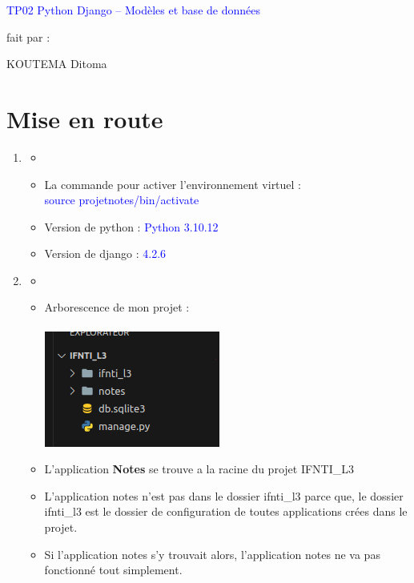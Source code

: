 \documentclass[10pt,a4paper]{article}
\author{KOUTEMA Ditoma}
\begin{document}

\begin{shadedbox}
\begin{center}
\huge \textcolor{blue}{TP02 Python Django – Modèles et base de données}
\end{center}
\end{shadedbox}
\large{\begin{center}
fait par : 
\end{center}}
\begin{center}
\huge{KOUTEMA Ditoma}
\end{center}
\newpage
\tableofcontents
\newpage

\section{Mise en route}
\begin{enumerate}
\item 
\begin{itemize}
\item[]
\item La commande pour activer l'environnement virtuel :\\ \textcolor{blue}{source projetnotes/bin/activate}
\item Version de python : \textcolor{blue}{Python 3.10.12}
\item Version de django : \textcolor{blue}{4.2.6}
\end{itemize}

\item 
\begin{itemize}
\item[]
\item Arborescence de mon projet : \\\\
\includegraphics[scale=0.8]{1.png}
\item L'application \textbf{Notes} se trouve a la racine du projet IFNTI\_L3\\
\item L'application notes n'est pas dans le dossier ifnti\_l3 parce que, le dossier ifnti\_l3 est le dossier de configuration de toutes applications crées dans le projet.\\
\item Si l'application notes s'y trouvait alors, l'application notes ne va pas fonctionné tout simplement.
\end{itemize}
\end{enumerate}
\end{document}
